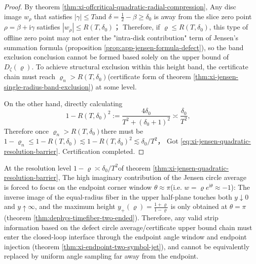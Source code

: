 \begin{proof}
By theorem \ref{thm:xi-offcritical-quadratic-radial-compression},
Any disc image \(w_\rho\) that satisfies \(|\gamma|\le T\) ​​and \(\delta=\tfrac12-\beta\ge\delta_0\) is away from the slice zero point \(\rho=\beta+\mathrm{i}\gamma\) satisfies
\(|w_\rho|\le R(T,\delta_0)\)；
Therefore, if \(\varrho\le R(T,\delta_0)\), this type of offline zero point may not enter the "intra-disk contribution" term of Jensen's summation formula (proposition \ref{prop:app-jensen-formula-defect}), so the band exclusion conclusion cannot be formed based solely on the upper bound of \(D_\zeta(\varrho)\).
To achieve structural exclusion within this height band, the certificate chain must reach \(\varrho_n>R(T,\delta_0)\) ​​(certificate form of theorem \ref{thm:xi-jensen-single-radius-band-exclusion}) at some level.
\par
On the other hand, directly calculating
\[
1-R(T,\delta_0)^2
:=\frac{4\delta_0}{T^2+(\delta_0+1)^2}
\asymp \frac{\delta_0}{T^2},
\]
Therefore once \(\varrho_n>R(T,\delta_0)\) ​​there must be
\(
1-\varrho_n\le 1-R(T,\delta_0)\lesssim 1-R(T,\delta_0)^2\lesssim \delta_0/T^2
\)，
Got \eqref{eq:xi-jensen-quadratic-resolution-barrier}. Certification completed.
\end{proof}

\begin{corollary}\label{cor:xi-jensen-endpoint-angle-window-rigidity}
At the resolution level \(1-\varrho\asymp \delta_0/T^2\) ​​of theorem \ref{thm:xi-jensen-quadratic-resolution-barrier},
The high imaginary contribution of the Jensen circle average is forced to focus on the endpoint corner window \(\theta\approx \pi\) ​​(i.e. \(w=\varrho e^{\mathrm{i}\theta}\approx -1\)):
The inverse image of the equal-radius fiber in the upper half-plane touches both \(y\downarrow 0\) ​​and \(y\uparrow \infty\), and the maximum height \(y_+(\varrho)=\frac{1+\varrho}{1-\varrho}\) is only obtained at \(\theta=\pi\) (theorem \ref{thm:dephys-timefiber-two-ended}).
Therefore, any valid strip information based on the defect circle average/certificate upper bound chain must enter the closed-loop interface through the endpoint angle window and endpoint injection (theorem \ref{thm:xi-endpoint-two-symbol-jet}), and cannot be equivalently replaced by uniform angle sampling far away from the endpoint.
\end{corollary}

